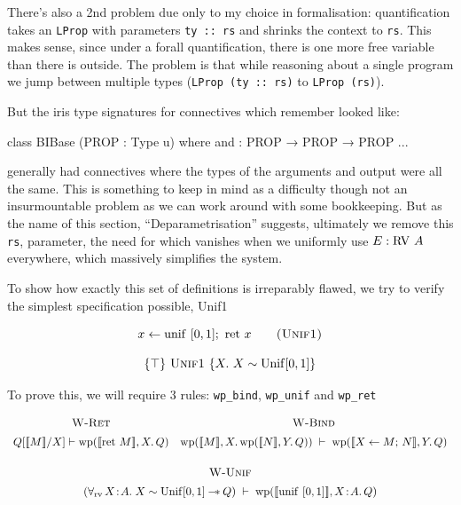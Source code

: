 There's also a 2nd problem due only to my choice in formalisation: quantification takes an \texttt{LProp} with parameters \texttt{ty :: rs} and shrinks
the context to \texttt{rs}. This makes sense, since under a forall quantification, there is one more free variable than there is outside. The problem is that while reasoning about a
single program we jump between multiple types (\texttt{LProp (ty :: rs)} to \texttt{LProp (rs)}).

But the iris type signatures for connectives which remember looked like:
\begin{leancode}
class BIBase (PROP : Type u) where
  and : PROP → PROP → PROP
  ...
\end{leancode}

generally had connectives where the types of the arguments and output were all the same. This is something to keep in mind as a difficulty though not an insurmountable problem as we can
work around with some bookkeeping. But as the name of this section, ``Deparametrisation'' suggests, ultimately we remove this \texttt{rs}, parameter, the need for which vanishes
when we uniformly use $E : \mathrm{RV\ } A$ everywhere, which massively simplifies the system.

To show how exactly this set of definitions is irreparably flawed, we try to verify the simplest specification possible, Unif1

\[
x \leftarrow \mathrm{unif}\ [0,1];\ \mathrm{ret}\ x
\qquad \textsc{(Unif1)}
\]

\[
\{ \top \}\ \textsc{Unif1}\ \{ X.\ X \sim \mathrm{Unif}[0,1] \}
\]

To prove this, we will require 3 rules: \texttt{wp\_bind}, \texttt{wp\_unif} and \texttt{wp\_ret}

\[
\begin{array}{cc}
\textsc{W-Ret}
&
\textsc{W-Bind}
\\[0.5em]
Q[\llbracket M \rrbracket / X] \vdash \mathrm{wp}(\llbracket \mathrm{ret}\ M \rrbracket, X.\,Q)
&
\mathrm{wp}(\llbracket M \rrbracket, X.\,\mathrm{wp}(\llbracket N \rrbracket, Y.\,Q))
\;\vdash\;
\mathrm{wp}(\llbracket X \leftarrow M;\, N \rrbracket, Y.\,Q)
\\[1.5em]
\multicolumn{2}{c}{
\textsc{W-Unif}
}
\\[0.5em]
\multicolumn{2}{c}{
(\forall_{\mathrm{rv}}\, X\!:\!A.\; X \sim \mathrm{Unif}[0,1] \mathbin{-\!*} Q)
\;\vdash\;
\mathrm{wp}(\llbracket \mathrm{unif}\ [0,1] \rrbracket, X\!:\!A.\,Q)
}
\end{array}
\]

